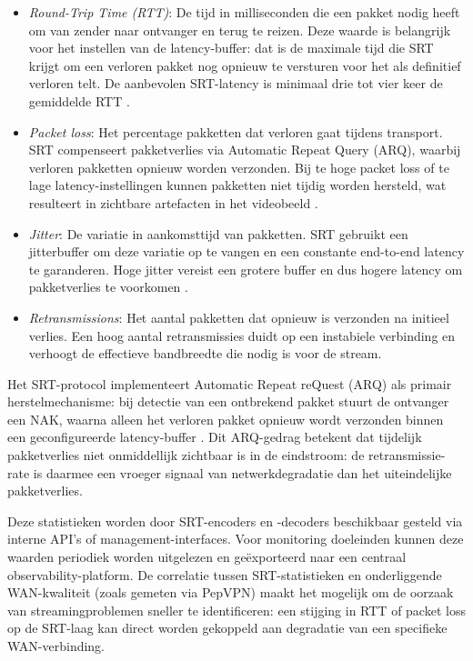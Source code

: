 \begin{itemize}
\item \emph{Round-Trip Time (RTT)}: De tijd in milliseconden die een pakket nodig heeft om van zender naar ontvanger en terug te reizen. Deze waarde is belangrijk voor het instellen van de latency-buffer: dat is de maximale tijd die SRT krijgt om een verloren pakket nog opnieuw te versturen voor het als definitief verloren telt. De aanbevolen SRT-latency is minimaal drie tot vier keer de gemiddelde RTT \autocite{Sharabayko2022}.

\item \emph{Packet loss}: Het percentage pakketten dat verloren gaat tijdens transport. SRT compenseert pakketverlies via Automatic Repeat Query (ARQ), waarbij verloren pakketten opnieuw worden verzonden. Bij te hoge packet loss of te lage latency-instellingen kunnen pakketten niet tijdig worden hersteld, wat resulteert in zichtbare artefacten in het videobeeld \autocite{Haivision2023}.

\item \emph{Jitter}: De variatie in aankomsttijd van pakketten. SRT gebruikt een jitterbuffer om deze variatie op te vangen en een constante end-to-end latency te garanderen. Hoge jitter vereist een grotere buffer en dus hogere latency om pakketverlies te voorkomen \autocite{Sharabayko2021}.

\item \emph{Retransmissions}: Het aantal pakketten dat opnieuw is verzonden na initieel verlies. Een hoog aantal retransmissies duidt op een instabiele verbinding en verhoogt de effectieve bandbreedte die nodig is voor de stream.

\end{itemize}

Het SRT-protocol implementeert Automatic Repeat reQuest (ARQ) als primair herstelmechanisme: bij detectie van een ontbrekend pakket stuurt de ontvanger een NAK, waarna alleen het verloren pakket opnieuw wordt verzonden binnen een geconfigureerde latency-buffer \autocite{Sharabayko2021}. Dit ARQ-gedrag betekent dat tijdelijk pakketverlies niet onmiddellijk zichtbaar is in de eindstroom: de retransmissie-rate is daarmee een vroeger signaal van netwerkdegradatie dan het uiteindelijke pakketverlies.

Deze statistieken worden door SRT-encoders en -decoders beschikbaar gesteld via interne API's of management-interfaces. Voor monitoring doeleinden kunnen deze waarden periodiek worden uitgelezen en geëxporteerd naar een centraal observability-platform. De correlatie tussen SRT-statistieken en onderliggende WAN-kwaliteit (zoals gemeten via PepVPN) maakt het mogelijk om de oorzaak van streamingproblemen sneller te identificeren: een stijging in RTT of packet loss op de SRT-laag kan direct worden gekoppeld aan degradatie van een specifieke WAN-verbinding.

